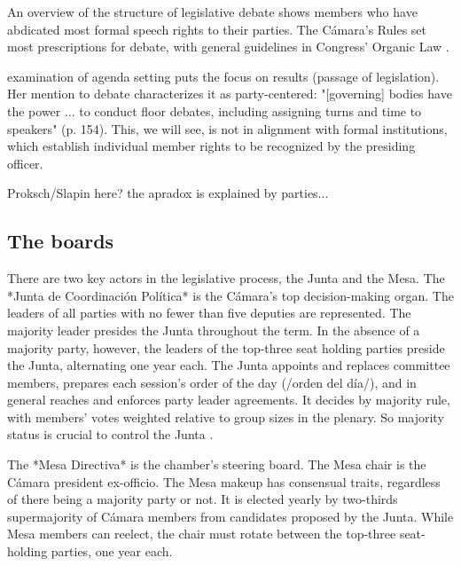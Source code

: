 \documentclass[letter,12pt]{article}
\begin{document}
An overview of the structure of legislative debate shows members who have abdicated most formal speech rights to their parties. The Cámara's Rules \citep{reglamentoDipMx.2019} set most prescriptions for debate, with general guidelines in Congress' Organic Law \citep{loceum.2019}.

\citet{casar.agsetting.2016} examination of agenda setting puts the focus on results (passage of legislation). Her mention to debate characterizes it as party-centered: "[governing] bodies have the power ... to conduct floor debates, including assigning turns and time to speakers" (p. 154). This, we will see, is not in alignment with formal institutions, which establish individual member rights to be recognized by the presiding officer.

Proksch/Slapin here? the apradox is explained by parties... 



  \subsection{The boards}
There are two key actors in the legislative process, the Junta and the Mesa. The *Junta de Coordinación Política* is the Cámara's top decision-making organ. The leaders of all parties with no fewer than five deputies are represented. The majority leader presides the Junta throughout the term. In the absence of a majority party, however, the leaders of the top-three seat holding parties preside the Junta, alternating one year each. The Junta appoints and replaces committee members, prepares each session's order of the day (/orden del día/), and in general reaches and enforces party leader agreements. It decides by majority rule, with members' votes weighted relative to group sizes in the plenary. So majority status is crucial to control the Junta \citep[cf.][]{cox.mccubbins.2005}.



The *Mesa Directiva* is the chamber's steering board. The Mesa chair is the Cámara president ex-officio. The Mesa makeup has consensual traits, regardless of there being a majority party or not. It is elected yearly by two-thirds supermajority of Cámara members from candidates proposed by the Junta. While Mesa members can reelect, the chair must rotate between the top-three seat-holding parties, one year each. 
\end{document}
